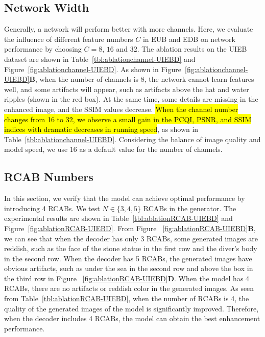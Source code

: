 \documentclass[utf8]{FrontiersinHarvard} %
\begin{document}
\subsection{Network Width}
Generally, a network will perform better with more channels. Here, we evaluate the influence of different feature numbers $C$ in EUB and EDB on network performance by choosing $C=8$, $16$ and $32$. The ablation results on the UIEB dataset are shown in Table~\ref{tbl:ablationchannel-UIEBD} and Figure~\ref{fig:ablationchannel-UIEBD}. As shown in Figure~\ref{fig:ablationchannel-UIEBD}\textbf{B}, when the number of channels is 8, the network cannot learn features well, and some artifacts will appear, such as artifacts above the hat and water ripples (shown in the red box). At the same time, some details are missing in the enhanced image, and the SSIM values decrease. \hl{When the channel number changes from 16 to 32, we observe a small gain in the PCQI, PSNR, and SSIM indices with dramatic decreases in running speed}, as shown in Table~\ref{tbl:ablationchannel-UIEBD}. Considering the balance of image quality and model speed, we use 16 as a default value for the number of channels. 

\subsection{RCAB Numbers}
In this section, we verify that the model can achieve optimal performance by introducing 4 RCABs. We test $N \in\{3,4,5\}$ RCABs in the generator. The experimental results are shown in Table~\ref{tbl:ablationRCAB-UIEBD} and Figure~\ref{fig:ablationRCAB-UIEBD}. From Figure ~\ref{fig:ablationRCAB-UIEBD}\textbf{B}, we can see that when the decoder has only 3 RCABs, some generated images are reddish, such as the face of the stone statue in the first row and the diver's body in the second row. When the decoder has 5 RCABs, the generated images have obvious artifacts, such as under the sea in the second row and above the box in the third row in Figure ~\ref{fig:ablationRCAB-UIEBD}\textbf{D}. When the model has 4 RCABs, there are no artifacts or reddish color in the generated images. As seen from Table~\ref{tbl:ablationRCAB-UIEBD}, when the number of RCABs is 4, the quality of the generated images of the model is significantly improved. Therefore, when the decoder includes 4 RCABs, the model can obtain the best enhancement performance.
\end{document}

